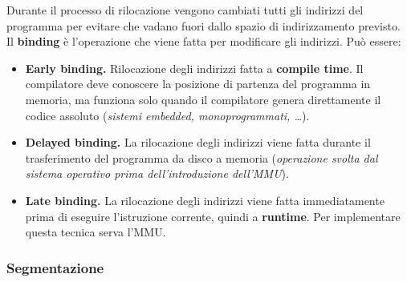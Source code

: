 \documentclass[12pt, letterpaper]{article}
\begin{document}
				Durante il processo di rilocazione vengono cambiati tutti gli indirizzi del programma per evitare che vadano fuori dallo spazio di indirizzamento previsto. Il \textbf{binding} è l'operazione che viene fatta per modificare gli indirizzi. Può essere: 
				\begin{itemize}
					\item \textbf{Early binding.} Rilocazione degli indirizzi fatta a \textbf{compile time}. Il compilatore deve conoscere la posizione di partenza del programma in memoria, ma funziona solo quando il compilatore genera direttamente il codice assoluto (\textit{sistemi embedded, monoprogrammati, \dots}).
					\item \textbf{Delayed binding.} La rilocazione degli indirizzi viene fatta durante il trasferimento del programma da disco a memoria (\textit{operazione svolta dal sistema operativo prima dell'introduzione dell'MMU}).
					\item \textbf{Late binding.} La rilocazione degli indirizzi viene fatta immediatamente prima di eseguire l'istruzione corrente, quindi a \textbf{runtime}. Per implementare questa tecnica serva l'MMU. 
				\end{itemize}
				
			\subsubsection{Segmentazione}
				
\end{document}
